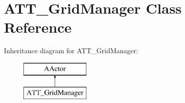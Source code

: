 \hypertarget{class_a_t_t___grid_manager}{}\section{A\+T\+T\+\_\+\+Grid\+Manager Class Reference}
\label{class_a_t_t___grid_manager}
Inheritance diagram for A\+T\+T\+\_\+\+Grid\+Manager\+:\begin{figure}[H]
\begin{center}
\leavevmode
\includegraphics[height=2.000000cm]{class_a_t_t___grid_manager}
\end{center}
\end{figure}
